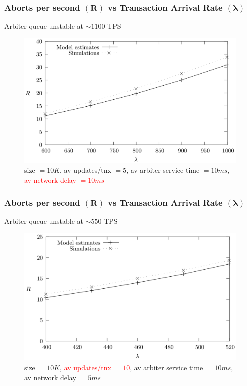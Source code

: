 \documentclass[aspectratio=169]{beamer}
\begin{document}
\begin{frame}
  \frametitle{Aborts per second $(\boldsymbol{R})$ vs Transaction Arrival Rate $(\boldsymbol{\lambda})$}
  \begin{center}
    Arbiter queue unstable at $\sim 1100$ TPS
  \end{center}
  \begin{figure}[h!]
    \centering
    \includegraphics[scale=0.35]{images/larger_network_delay.png}
    \caption{size $= 10K$, av updates/tnx $= 5$, av arbiter service time $= 10ms$, \textcolor{red}{av network delay $=10ms$}}
  \end{figure}
\end{frame}

\begin{frame}
  \frametitle{Aborts per second $(\boldsymbol{R})$ vs Transaction Arrival Rate $(\boldsymbol{\lambda})$}
  \begin{center}
    Arbiter queue unstable at $\sim 550$ TPS
  \end{center}
    \begin{figure}[h!]
    \centering
    \includegraphics[scale=0.35]{images/varying_updates_per_tnx.png}
        \caption{size $= 10K$, \textcolor{red}{av updates/tnx $= 10$}, av arbiter service time $= 10ms$, av network delay $=5ms$}
  \end{figure}
\end{frame}
\end{document}
